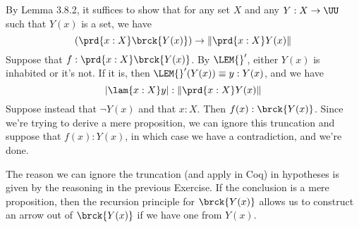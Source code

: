  \soln
By Lemma 3.8.2, it suffices to show that for any set $X$ and any $Y : X \to
\UU$ such that $Y(x)$ is a set, we have
\[
  \left(\prd{x:X}\brck{Y(x)}\right) \to \left\lVert\prd{x:X}Y(x)\right\rVert
\]
Suppose that $f : \prd{x:X}\brck{Y(x)}$.  By $\LEM{}'$, either $Y(x)$ is
inhabited or it's not.  If it is, then $\LEM{}'(Y(x)) \equiv y : Y(x)$, and we
have
\[
  \left\lvert\lam{x:X}y\right\rvert : \left\lVert \prd{x:X} Y(x) \right\rVert
\]
Suppose instead that $\lnot Y(x)$ and that $x:X$.  Then $f(x) : \brck{Y(x)}$.
Since we're trying to derive a mere proposition, we can ignore this truncation
and suppose that $f(x) : Y(x)$, in which case we have a contradiction, and
we're done.


The reason we can ignore the truncation (and apply  in Coq)
in hypotheses is given by the reasoning in the previous Exercise.  If the
conclusion is a mere proposition, then the recursion principle for
$\brck{Y(x)}$ allows us to construct an arrow out of $\brck{Y(x)}$ if we have
one from $Y(x)$.
